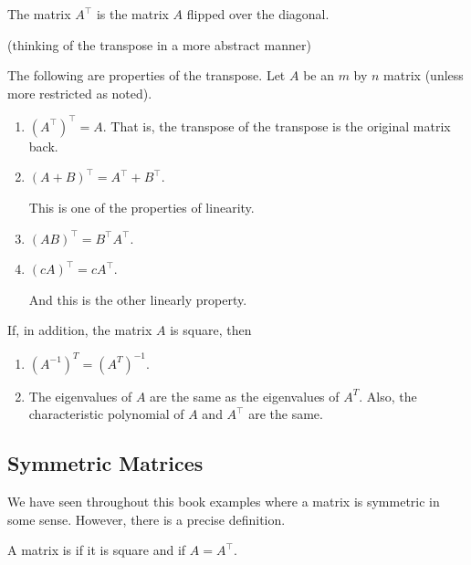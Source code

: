The matrix $A^{\intercal}$ is the matrix $A$ flipped over the diagonal.  

(thinking of the transpose in a more abstract manner)

\begin{theorem}

\label{thm:matrix:transpose}

The following are properties of the transpose.   Let $A$ be an $m$ by $n$ matrix (unless more restricted as noted). 

\begin{enumerate}
\item $(A^{\intercal})^{\intercal} = A$.  That is, the transpose of the transpose is the original matrix back. 
\item $(A+B)^{\intercal} = A^{\intercal} + B^{\intercal}$. 

This is one of the properties of linearity.   
\item $(AB)^{\intercal} = B^{\intercal} A^{\intercal}$. 
\item $(cA)^{\intercal} = c A^{\intercal}$. 

And this is the other linearly property. 
\end{enumerate}
If, in addition, the matrix $A$ is square, then 
\begin{enumerate}[start=5]
\item $(A^{-1})^T=(A^T)^{-1}$.  
\item The eigenvalues of $A$ are the same as the eigenvalues of $A^T$.  Also, the characteristic polynomial of $A$ and $A^{\intercal}$ are the same.  
\end{enumerate}

\end{theorem}

%
%

\subsection{Symmetric Matrices}

We have seen throughout this book examples where a matrix is symmetric in some sense.  However, there is a precise definition. 

\begin{definition}
A matrix is  if it is square and if $A= A^{\intercal}$. 
\end{definition}

